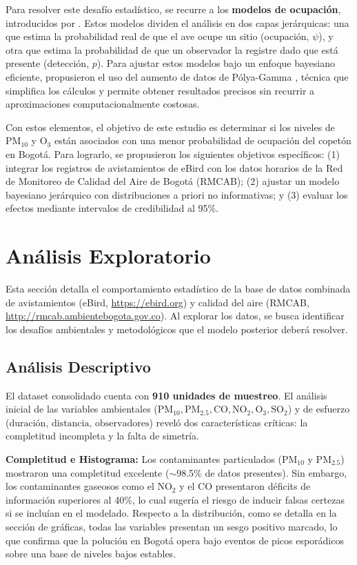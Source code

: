 \documentclass[twocolumn,10pt]{article}
\begin{document}
Para resolver este desafío estadístico, se recurre a los \textbf{modelos de ocupación}, introducidos por \cite{mackenzie2002}. Estos modelos dividen el análisis en dos capas jerárquicas: una que estima la probabilidad real de que el ave ocupe un sitio (ocupación, $\psi$), y otra que estima la probabilidad de que un observador la registre dado que está presente (detección, $p$). Para ajustar estos modelos bajo un enfoque bayesiano eficiente, \cite{clark2019} propusieron el uso del aumento de datos de Pólya-Gamma \citep{polson2013}, técnica que simplifica los cálculos y permite obtener resultados precisos sin recurrir a aproximaciones computacionalmente costosas.

Con estos elementos, el objetivo de este estudio es determinar si los niveles de $\text{PM}_{10}$ y $\text{O}_3$ están asociados con una menor probabilidad de ocupación del copetón en Bogotá. Para lograrlo, se propusieron los siguientes objetivos específicos: (1) integrar los registros de avistamientos de eBird \citep{sullivan2009} con los datos horarios de la Red de Monitoreo de Calidad del Aire de Bogotá (RMCAB); (2) ajustar un modelo bayesiano jerárquico con distribuciones a priori no informativas; y (3) evaluar los efectos mediante intervalos de credibilidad al 95\%.

\section{Análisis Exploratorio}

\justifying
Esta sección detalla el comportamiento estadístico de la base de datos combinada de avistamientos (eBird, \url{https://ebird.org}) y calidad del aire (RMCAB, \url{http://rmcab.ambientebogota.gov.co}). Al explorar los datos, se busca identificar los desafíos ambientales y metodológicos que el modelo posterior deberá resolver.

\subsection{Análisis Descriptivo}

El dataset consolidado cuenta con \textbf{910 unidades de muestreo}. El análisis inicial de las variables ambientales ($\text{PM}_{10}, \text{PM}_{2.5}, \text{CO}, \text{NO}_2, \text{O}_3, \text{SO}_2$) y de esfuerzo ($\text{duración, distancia, observadores}$) reveló dos características críticas: la completitud incompleta y la falta de simetría.

\textbf{Completitud e Histograma:}
Los contaminantes particulados ($\text{PM}_{10}$ y $\text{PM}_{2.5}$) mostraron una completitud excelente ($\sim$98.5\% de datos presentes). Sin embargo, los contaminantes gaseosos como el $\text{NO}_2$ y el $\text{CO}$ presentaron déficits de información superiores al 40\%, lo cual sugería el riesgo de inducir falsas certezas si se incluían en el modelado. Respecto a la distribución, como se detalla en la sección de gráficas, todas las variables presentan un sesgo positivo marcado, lo que confirma que la polución en Bogotá opera bajo eventos de picos esporádicos sobre una base de niveles bajos estables.
\end{document}
